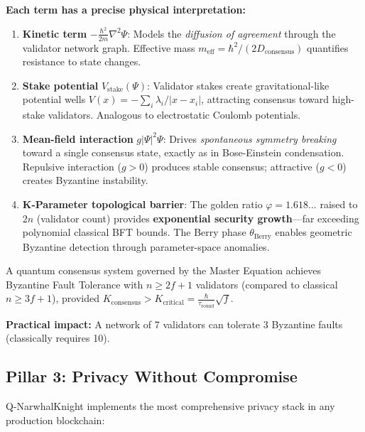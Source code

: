 \documentclass[11pt,a4paper]{article}
\begin{document}
\textbf{Each term has a precise physical interpretation:}

\begin{enumerate}[leftmargin=1.5em]
    \item \textbf{Kinetic term} $-\frac{\hbar^2}{2m}\nabla^2\Psi$: Models the \textit{diffusion of agreement} through the validator network graph. Effective mass $m_{\text{eff}} = \hbar^2/(2D_{\text{consensus}})$ quantifies resistance to state changes.

    \item \textbf{Stake potential} $V_{\text{stake}}(\Psi)$: Validator stakes create gravitational-like potential wells $V(x) = -\sum_i \lambda_i / |x - x_i|$, attracting consensus toward high-stake validators. Analogous to electrostatic Coulomb potentials.

    \item \textbf{Mean-field interaction} $g|\Psi|^2\Psi$: Drives \textit{spontaneous symmetry breaking} toward a single consensus state, exactly as in Bose-Einstein condensation. Repulsive interaction ($g > 0$) produces stable consensus; attractive ($g < 0$) creates Byzantine instability.

    \item \textbf{K-Parameter topological barrier}: The golden ratio $\varphi = 1.618\ldots$ raised to $2n$ (validator count) provides \textbf{exponential security growth}---far exceeding polynomial classical BFT bounds. The Berry phase $\theta_{\text{Berry}}$ enables geometric Byzantine detection through parameter-space anomalies.
\end{enumerate}

\begin{successbox}
A quantum consensus system governed by the Master Equation achieves Byzantine Fault Tolerance with $n \geq 2f + 1$ validators (compared to classical $n \geq 3f + 1$), provided $K_{\text{consensus}} > K_{\text{critical}} = \frac{\hbar}{\tau_{\text{round}}} \sqrt{f}$.

\textbf{Practical impact:} A network of 7 validators can tolerate 3 Byzantine faults (classically requires 10).
\end{successbox}

\subsection{Pillar 3: Privacy Without Compromise}

Q-NarwhalKnight implements the most comprehensive privacy stack in any production blockchain:
\end{document}
